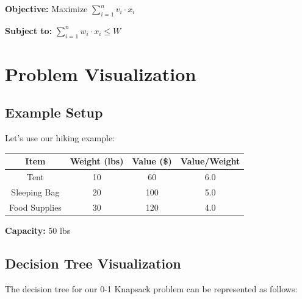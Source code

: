 \documentclass[12pt,a4paper]{article}
\begin{document}
\textbf{Objective:} Maximize $\sum_{i=1}^{n} v_i \cdot x_i$

\textbf{Subject to:} $\sum_{i=1}^{n} w_i \cdot x_i \leq W$

\section{Problem Visualization}

\subsection{Example Setup}
Let's use our hiking example:
\begin{center}
\begin{tabular}{|c|c|c|c|}
\hline
\textbf{Item} & \textbf{Weight (lbs)} & \textbf{Value (\$)} & \textbf{Value/Weight} \\
\hline
Tent & 10 & 60 & 6.0 \\
Sleeping Bag & 20 & 100 & 5.0 \\
Food Supplies & 30 & 120 & 4.0 \\
\hline
\end{tabular}
\end{center}

\textbf{Capacity:} 50 lbs

\subsection{Decision Tree Visualization}

The decision tree for our 0-1 Knapsack problem can be represented as follows:
\end{document}
